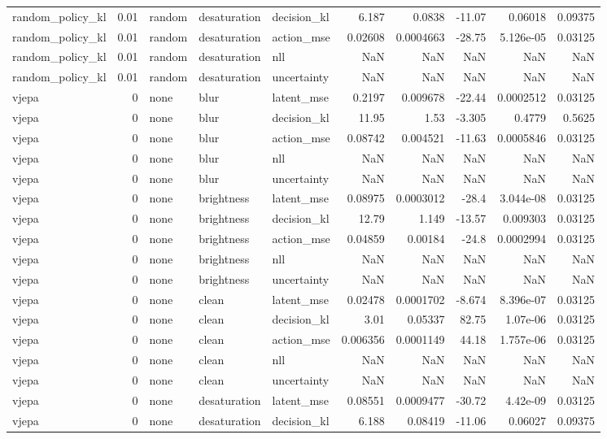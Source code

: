 \begin{tabular}{lrlllrrrrr}
random\_policy\_kl & 0.01 & random & desaturation & decision\_kl & 6.187 & 0.0838 & -11.07 & 0.06018 & 0.09375 \\
random\_policy\_kl & 0.01 & random & desaturation & action\_mse & 0.02608 & 0.0004663 & -28.75 & 5.126e-05 & 0.03125 \\
random\_policy\_kl & 0.01 & random & desaturation & nll & NaN & NaN & NaN & NaN & NaN \\
random\_policy\_kl & 0.01 & random & desaturation & uncertainty & NaN & NaN & NaN & NaN & NaN \\
vjepa & 0 & none & blur & latent\_mse & 0.2197 & 0.009678 & -22.44 & 0.0002512 & 0.03125 \\
vjepa & 0 & none & blur & decision\_kl & 11.95 & 1.53 & -3.305 & 0.4779 & 0.5625 \\
vjepa & 0 & none & blur & action\_mse & 0.08742 & 0.004521 & -11.63 & 0.0005846 & 0.03125 \\
vjepa & 0 & none & blur & nll & NaN & NaN & NaN & NaN & NaN \\
vjepa & 0 & none & blur & uncertainty & NaN & NaN & NaN & NaN & NaN \\
vjepa & 0 & none & brightness & latent\_mse & 0.08975 & 0.0003012 & -28.4 & 3.044e-08 & 0.03125 \\
vjepa & 0 & none & brightness & decision\_kl & 12.79 & 1.149 & -13.57 & 0.009303 & 0.03125 \\
vjepa & 0 & none & brightness & action\_mse & 0.04859 & 0.00184 & -24.8 & 0.0002994 & 0.03125 \\
vjepa & 0 & none & brightness & nll & NaN & NaN & NaN & NaN & NaN \\
vjepa & 0 & none & brightness & uncertainty & NaN & NaN & NaN & NaN & NaN \\
vjepa & 0 & none & clean & latent\_mse & 0.02478 & 0.0001702 & -8.674 & 8.396e-07 & 0.03125 \\
vjepa & 0 & none & clean & decision\_kl & 3.01 & 0.05337 & 82.75 & 1.07e-06 & 0.03125 \\
vjepa & 0 & none & clean & action\_mse & 0.006356 & 0.0001149 & 44.18 & 1.757e-06 & 0.03125 \\
vjepa & 0 & none & clean & nll & NaN & NaN & NaN & NaN & NaN \\
vjepa & 0 & none & clean & uncertainty & NaN & NaN & NaN & NaN & NaN \\
vjepa & 0 & none & desaturation & latent\_mse & 0.08551 & 0.0009477 & -30.72 & 4.42e-09 & 0.03125 \\
vjepa & 0 & none & desaturation & decision\_kl & 6.188 & 0.08419 & -11.06 & 0.06027 & 0.09375 \\

\end{tabular}
